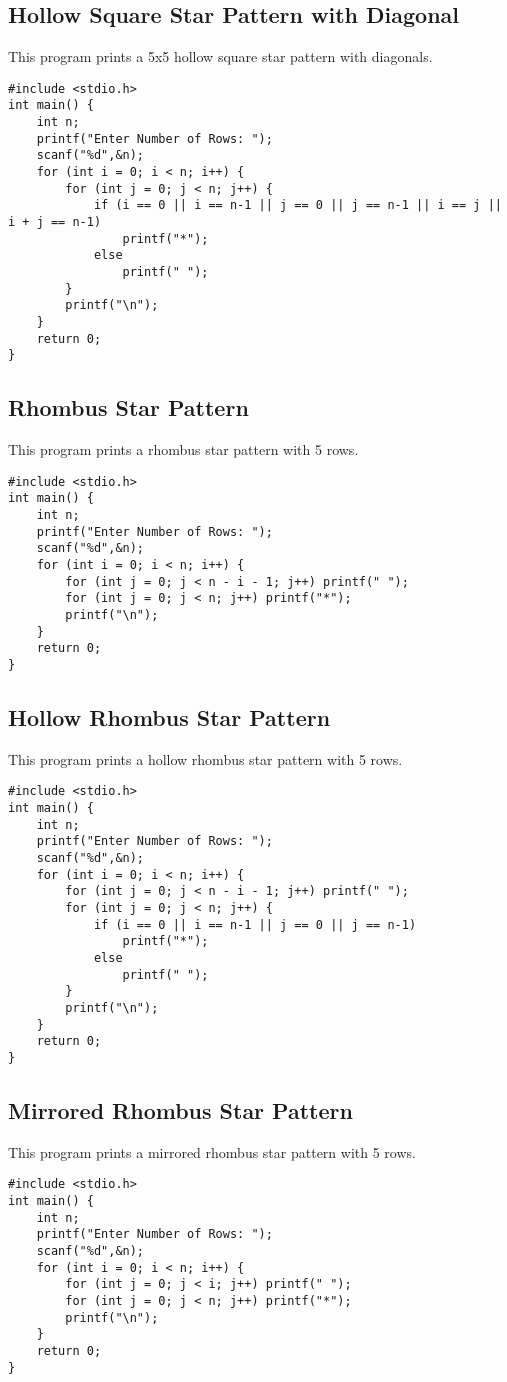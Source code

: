 \documentclass[a4paper,12pt]{article}
\begin{document}
\subsection{Hollow Square Star Pattern with Diagonal}
This program prints a 5x5 hollow square star pattern with diagonals.
\begin{lstlisting}[caption={Hollow Square Star Pattern with Diagonal}]
#include <stdio.h>
int main() {
    int n;
    printf("Enter Number of Rows: ");
    scanf("%d",&n);
    for (int i = 0; i < n; i++) {
        for (int j = 0; j < n; j++) {
            if (i == 0 || i == n-1 || j == 0 || j == n-1 || i == j || i + j == n-1)
                printf("*");
            else
                printf(" ");
        }
        printf("\n");
    }
    return 0;
}
\end{lstlisting}
\clearpage

\subsection{Rhombus Star Pattern}
This program prints a rhombus star pattern with 5 rows.
\begin{lstlisting}[caption={Rhombus Star Pattern}]
#include <stdio.h>
int main() {
    int n;
    printf("Enter Number of Rows: ");
    scanf("%d",&n);
    for (int i = 0; i < n; i++) {
        for (int j = 0; j < n - i - 1; j++) printf(" ");
        for (int j = 0; j < n; j++) printf("*");
        printf("\n");
    }
    return 0;
}
\end{lstlisting}
\clearpage

\subsection{Hollow Rhombus Star Pattern}
This program prints a hollow rhombus star pattern with 5 rows.
\begin{lstlisting}[caption={Hollow Rhombus Star Pattern}]
#include <stdio.h>
int main() {
    int n;
    printf("Enter Number of Rows: ");
    scanf("%d",&n);
    for (int i = 0; i < n; i++) {
        for (int j = 0; j < n - i - 1; j++) printf(" ");
        for (int j = 0; j < n; j++) {
            if (i == 0 || i == n-1 || j == 0 || j == n-1)
                printf("*");
            else
                printf(" ");
        }
        printf("\n");
    }
    return 0;
}
\end{lstlisting}
\clearpage

\subsection{Mirrored Rhombus Star Pattern}
This program prints a mirrored rhombus star pattern with 5 rows.
\begin{lstlisting}[caption={Mirrored Rhombus Star Pattern}]
#include <stdio.h>
int main() {
    int n;
    printf("Enter Number of Rows: ");
    scanf("%d",&n);
    for (int i = 0; i < n; i++) {
        for (int j = 0; j < i; j++) printf(" ");
        for (int j = 0; j < n; j++) printf("*");
        printf("\n");
    }
    return 0;
}
\end{lstlisting}
\clearpage
\end{document}
